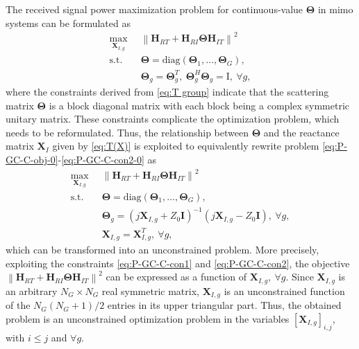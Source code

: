\documentclass[twocolumn,10pt]{IEEEtran}
\begin{document}
The received signal power maximization problem for continuous-value $\boldsymbol{\Theta}$ in \gls{mimo} systems can be formulated as
\begin{align}
\underset{\mathbf{X}_{I,g}}{\mathsf{\mathrm{max}}}\;\;
& \left\|\mathbf{H}_{RT}+\mathbf{H}_{RI}\boldsymbol{\Theta}\mathbf{H}_{IT}\right\|^{2}\label{eq:P-GC-C-obj-0}\\
\mathsf{\mathrm{s.t.}}\;\;\; & \boldsymbol{\Theta}=\mathrm{diag}\left(\boldsymbol{\Theta}_{1},\ldots,\boldsymbol{\Theta}_{G}\right),\label{eq:P-GC-C-con1-0}\\
& \boldsymbol{\Theta}_{g}=\boldsymbol{\Theta}_{g}^{T},\:\boldsymbol{\Theta}_{g}^{H}\boldsymbol{\Theta}_{g}=\boldsymbol{\mathrm{I}},\:\forall g,\label{eq:P-GC-C-con2-0}
\end{align}
where the constraints derived from \eqref{eq:T group} indicate that the scattering matrix $\boldsymbol{\Theta}$ is a block diagonal matrix with each block being a complex symmetric unitary matrix.
These constraints complicate the optimization problem, which needs to be reformulated.
Thus, the relationship between $\boldsymbol{\Theta}$ and the reactance matrix $\mathbf{X}_{I}$ given by \eqref{eq:T(X)} is exploited to equivalently rewrite problem \eqref{eq:P-GC-C-obj-0}-\eqref{eq:P-GC-C-con2-0} as
\begin{align}
\underset{\mathbf{X}_{I,g}}{\mathsf{\mathrm{max}}}\;\;
& \left\|\mathbf{H}_{RT}+\mathbf{H}_{RI}\boldsymbol{\Theta}\mathbf{H}_{IT}\right\|^{2}\label{eq:P-GC-C-obj}\\
\mathsf{\mathrm{s.t.}}\;\;\; & \boldsymbol{\Theta}=\mathrm{diag}\left(\boldsymbol{\Theta}_{1},\ldots,\boldsymbol{\Theta}_{G}\right),\label{eq:P-GC-C-con1}\\
& \boldsymbol{\Theta}_{g}=\left(j\mathbf{X}_{I,g}+Z_{0}\mathbf{I}\right)^{-1}\left(j\mathbf{X}_{I,g}-Z_{0}\mathbf{I}\right),\:\forall g,\label{eq:P-GC-C-con2}\\
& \mathbf{X}_{I,g}=\mathbf{X}_{I,g}^{T},\:\forall g,\label{eq:P-GC-C-con3}
\end{align}
which can be transformed into an unconstrained problem.
More precisely, exploiting the constraints \eqref{eq:P-GC-C-con1} and \eqref{eq:P-GC-C-con2}, the objective $\left\|\mathbf{H}_{RT}+\mathbf{H}_{RI}\boldsymbol{\Theta}\mathbf{H}_{IT}\right\|^{2}$ can be expressed as a function of $\mathbf{X}_{I,g},\:\forall g$.
Since $\mathbf{X}_{I,g}$ is an arbitrary $N_{G}\times N_{G}$ real symmetric matrix, $\mathbf{X}_{I,g}$ is an unconstrained function of the $N_{G}\left(N_{G}+1\right)/2$ entries in its upper triangular part.
Thus, the obtained problem is an unconstrained optimization problem in the variables $\left[\mathbf{X}_{I,g}\right]_{i,j}$, with $i\leq j$ and $\forall g$.
\end{document}
